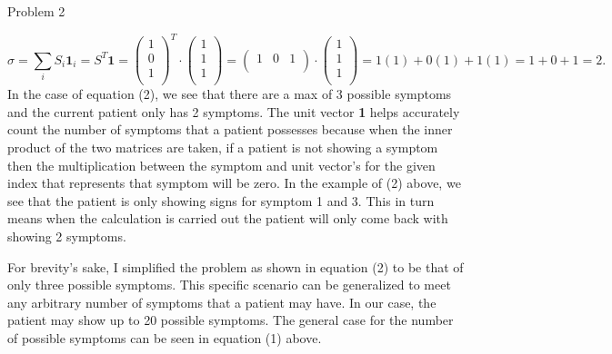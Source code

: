 \begin{problem}{Problem 2}
\begin{highlight}
        \begin{equation}
            \sigma = \sum_{i} S_{i}\mathbf{1}_{i} = S^{T}\mathbf{1} = 
            \begin{pmatrix}
                1 \\
                0 \\
                1 \\
            \end{pmatrix}^{T}
            \cdot
            \begin{pmatrix}
                1 \\
                1 \\
                1 \\
            \end{pmatrix}
            =
            \begin{pmatrix}
                1 & 0 & 1 \\
            \end{pmatrix}
            \cdot
            \begin{pmatrix}
                1 \\
                1 \\
                1 \\
            \end{pmatrix}
            = 1(1) + 0(1) + 1(1) = 1 + 0 + 1 = 2.
        \end{equation}
        In the case of equation (2), we see that there are a max of 3 possible symptoms and the current patient only has 2 symptoms. The unit vector \textbf{1} helps
        accurately count the number of symptoms that a patient possesses because when the inner product of the two matrices are taken, if a patient is not showing a symptom
        then the multiplication between the symptom and unit vector's for the given index that represents that symptom will be zero. In the example of (2) above, we see that
        the patient is only showing signs for symptom 1 and 3. This in turn means when the calculation is carried out the patient will only come back with showing 2 symptoms.

        For brevity's sake, I simplified the problem as shown in equation (2) to be that of only three possible symptoms. This specific scenario can be generalized to meet 
        any arbitrary number of symptoms that a patient may have. In our case, the patient may show up to 20 possible symptoms. The general case for the number of possible 
        symptoms can be seen in equation (1) above.
    \end{highlight}


\end{problem}
